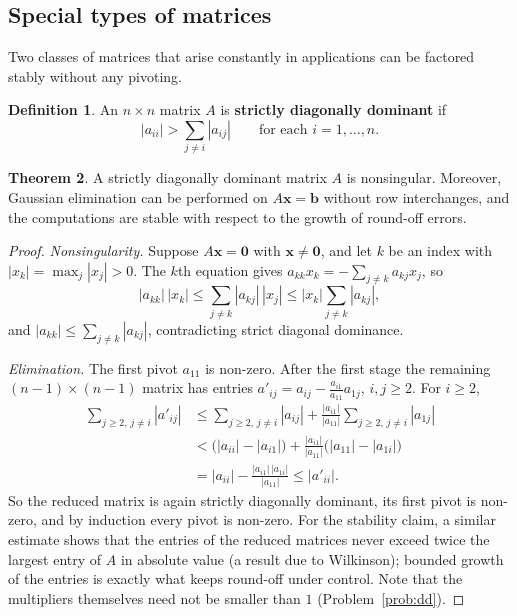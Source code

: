 \documentclass[11pt,a4paper]{article}
\numberwithin{equation}{section}
\theoremstyle{definition}
\newtheorem{thm}{Theorem}[subsection]
\newtheorem{defn}[thm]{Definition}
\begin{document}
\subsection{Special types of matrices}
\label{sec:special}

Two classes of matrices that arise constantly in applications can be factored stably without any pivoting.

\begin{defn}
An $n\times n$ matrix $A$ is \textbf{strictly diagonally dominant} if
$$|a_{ii}|>\sum_{j\neq i}|a_{ij}|\qquad\text{for each } i = 1,\dots,n .$$
\end{defn}

\begin{thm}
\label{thm:diagdom}
A strictly diagonally dominant matrix $A$ is nonsingular. Moreover, Gaussian elimination can be performed on $A\mathbf x = \mathbf b$ without
row interchanges, and the computations are stable with respect to the growth of round-off errors.
\end{thm}

\begin{proof}
\emph{Nonsingularity.} Suppose $A\mathbf x = \mathbf 0$ with $\mathbf x\neq\mathbf 0$, and let $k$ be an index with $|x_k| = \max_j|x_j|>0$. The
$k$th equation gives $a_{kk}x_k = -\sum_{j\neq k}a_{kj}x_j$, so
$$|a_{kk}|\,|x_k|\leq\sum_{j\neq k}|a_{kj}|\,|x_j|\leq|x_k|\sum_{j\neq k}|a_{kj}| ,$$
and $|a_{kk}|\leq\sum_{j\neq k}|a_{kj}|$, contradicting strict diagonal dominance.

\emph{Elimination.} The first pivot $a_{11}$ is non-zero. After the first stage the remaining $(n-1)\times(n-1)$ matrix has entries
$a'_{ij} = a_{ij}-\frac{a_{i1}}{a_{11}}a_{1j}$, $i,j\geq2$. For $i\geq2$,
\begin{align*}
\sum_{j\geq2,\,j\neq i}|a'_{ij}| &\leq\sum_{j\geq2,\,j\neq i}|a_{ij}|+\frac{|a_{i1}|}{|a_{11}|}\sum_{j\geq2,\,j\neq i}|a_{1j}|\\
&<\bigl(|a_{ii}|-|a_{i1}|\bigr)+\frac{|a_{i1}|}{|a_{11}|}\bigl(|a_{11}|-|a_{1i}|\bigr)\\
&= |a_{ii}|-\frac{|a_{i1}|\,|a_{1i}|}{|a_{11}|}\leq|a'_{ii}| .
\end{align*}
So the reduced matrix is again strictly diagonally dominant, its first pivot is non-zero, and by induction every pivot is non-zero.
For the stability claim, a similar estimate shows that the entries of the reduced matrices never exceed twice the largest entry of $A$ in
absolute value (a result due to Wilkinson); bounded growth of the entries is exactly what keeps round-off under control. Note that
the multipliers themselves need not be smaller than $1$ (Problem~\ref{prob:dd}).
\end{proof}
\end{document}
